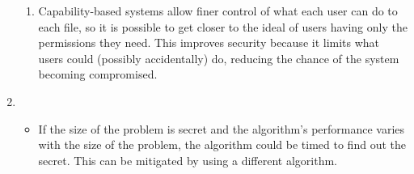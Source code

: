 \documentclass[11pt]{article}
\begin{document}
\begin{enumerate}
\begin{enumerate}
  \item Capability-based systems allow finer control of what each user can do to each file, so it is possible to get closer to the ideal of users having only the permissions they need. This improves security because it limits what users could (possibly accidentally) do, reducing the chance of the system becoming compromised.
  \end{enumerate}
\item
  \begin{itemize}
  \item If the size of the problem is secret and the algorithm's performance varies with the size of the problem, the algorithm could be timed to find out the secret. This can be mitigated by using a different algorithm.
  \end{itemize}
\end{enumerate}
\end{document}
